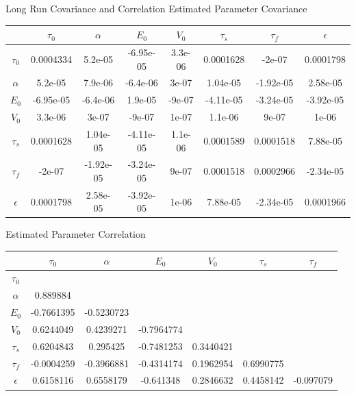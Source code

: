 \documentclass{beamer}
\begin{document}
\begin{frame}{Long Run Covariance and Correlation}
\centering
Estimated Parameter Covariance 

\begin{table}[t]
\tiny
\begin{tabular}{|c | c  c  c  c  c  c  c |}
\hline
  & $\tau_0$ & $\alpha$ & $E_0$    & $V_0$    & $\tau_s$ & $\tau_f$ & $\epsilon$ \\
\hline
\rowcolor[gray]{.8} $\tau_0$  & 0.0004334 & 5.2e-05 & -6.95e-05 & 3.3e-06 & 0.0001628 & -2e-07 & 0.0001798 \\
$\alpha$                      & 5.2e-05 & 7.9e-06 & -6.4e-06 & 3e-07 & 1.04e-05 & -1.92e-05 & 2.58e-05 \\
\rowcolor[gray]{.8} $E_0$     & -6.95e-05 & -6.4e-06 & 1.9e-05 & -9e-07 & -4.11e-05 & -3.24e-05 & -3.92e-05 \\
$V_0$                         & 3.3e-06 & 3e-07 & -9e-07 & 1e-07 & 1.1e-06 & 9e-07 & 1e-06 \\
\rowcolor[gray]{.8} $\tau_s$  & 0.0001628 & 1.04e-05 & -4.11e-05 & 1.1e-06 & 0.0001589 & 0.0001518 & 7.88e-05 \\
$\tau_f$                      & -2e-07 & -1.92e-05 & -3.24e-05 & 9e-07 & 0.0001518 & 0.0002966 & -2.34e-05 \\
\rowcolor[gray]{.8} $\epsilon$& 0.0001798 & 2.58e-05 & -3.92e-05 & 1e-06 & 7.88e-05 & -2.34e-05 & 0.0001966 \\
\hline
\end{tabular}
\label{tab:long_cov}
\end{table}

Estimated Parameter Correlation 

\begin{table}[t]
\tiny
\begin{tabular}{|c | c  c  c  c  c  c  |}
\hline
  & $\tau_0$ & $\alpha$ & $E_0$    & $V_0$    & $\tau_s$ & $\tau_f$  \\
\hline
\rowcolor[gray]{.8} $\tau_0$  & & & & & & \\
$\alpha$                      & 0.889884 & & & & & \\
\rowcolor[gray]{.8} $E_0$     & -0.7661395 & -0.5230723 & & & & \\
$V_0$                         & 0.6244049 & 0.4239271 & -0.7964774 & & & \\
\rowcolor[gray]{.8} $\tau_s$  & 0.6204843 & 0.295425 & -0.7481253 & 0.3440421 & & \\
$\tau_f$                      & -0.0004259 & -0.3966881 & -0.4314174 & 0.1962954 & 0.6990775 & \\
\rowcolor[gray]{.8} $\epsilon$& 0.6158116 & 0.6558179 & -0.641348 & 0.2846632 & 0.4458142 & -0.097079 \\
\hline
\end{tabular}
\label{tab:long_corr}
\end{table}
\end{frame}
\end{document}
